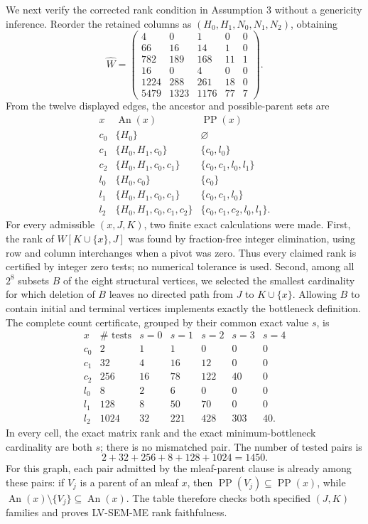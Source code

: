 We next verify the corrected rank condition in Assumption 3 without a genericity inference.  Reorder the retained columns as \((H_0,H_1,N_0,N_1,N_2)\), obtaining
\[
\widehat W=
\begin{pmatrix}
4&0&1&0&0\\
66&16&14&1&0\\
782&189&168&11&1\\
16&0&4&0&0\\
1224&288&261&18&0\\
5479&1323&1176&77&7
\end{pmatrix}.
\]
From the twelve displayed edges, the ancestor and possible-parent sets are
\[
\begin{array}{c|c|c}
x&\operatorname{An}(x)&\operatorname{PP}(x)\\ \hline
c_0&\{H_0\}&\varnothing\\
c_1&\{H_0,H_1,c_0\}&\{c_0,l_0\}\\
c_2&\{H_0,H_1,c_0,c_1\}&\{c_0,c_1,l_0,l_1\}\\
l_0&\{H_0,c_0\}&\{c_0\}\\
l_1&\{H_0,H_1,c_0,c_1\}&\{c_0,c_1,l_0\}\\
l_2&\{H_0,H_1,c_0,c_1,c_2\}&\{c_0,c_1,c_2,l_0,l_1\}.
\end{array}
\]
For every admissible \((x,J,K)\), two finite exact calculations were made.  First, the rank of \(\widehat W[K\cup\{x\},J]\) was found by fraction-free integer elimination, using row and column interchanges when a pivot was zero.  Thus every claimed rank is certified by integer zero tests; no numerical tolerance is used.  Second, among all \(2^8\) subsets \(B\) of the eight structural vertices, we selected the smallest cardinality for which deletion of \(B\) leaves no directed path from \(J\) to \(K\cup\{x\}\).  Allowing \(B\) to contain initial and terminal vertices implements exactly the bottleneck definition.  The complete count certificate, grouped by their common exact value \(s\), is
\[
\begin{array}{c|r|rrrrr}
x&\#\text{ tests}&s=0&s=1&s=2&s=3&s=4\\ \hline
c_0&2&1&1&0&0&0\\
c_1&32&4&16&12&0&0\\
c_2&256&16&78&122&40&0\\
l_0&8&2&6&0&0&0\\
l_1&128&8&50&70&0&0\\
l_2&1024&32&221&428&303&40.
\end{array}
\]
In every cell, the exact matrix rank and the exact minimum-bottleneck cardinality are both \(s\); there is no mismatched pair.  The number of tested pairs is
\[
2+32+256+8+128+1024=1450.
\]
For this graph, each pair admitted by the mleaf-parent clause is already among these pairs: if \(V_j\) is a parent of an mleaf \(x\), then \(\operatorname{PP}(V_j)\subseteq\operatorname{PP}(x)\), while \(\operatorname{An}(x)\setminus\{V_j\}\subseteq\operatorname{An}(x)\).  The table therefore checks both specified \((J,K)\) families and proves LV-SEM-ME rank faithfulness.

